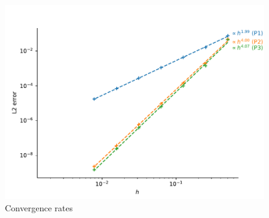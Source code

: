 \begin{figure}
    \centering
    \includegraphics[width=\linewidth]{Figures/Chapter2/convergence_rate_heat_transfer.pdf}
    \caption{Convergence rates}
    \label{fig: convergence rates heat transfer}
\end{figure}
